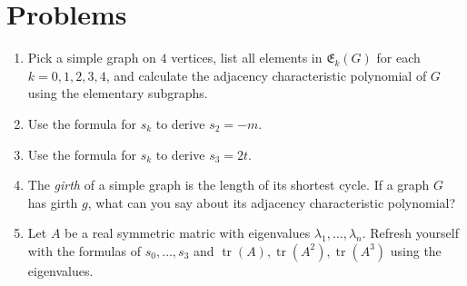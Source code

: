\documentclass{article}
\newcommand{\tr}{\operatorname{tr}}
\theoremstyle{definition}
\begin{document}
\section*{Problems}
\begin{enumerate}
\setlength\itemsep{2em}
\item Pick a simple graph on $4$ vertices, list all elements in $\mathfrak{E}_k(G)$ for each $k = 0,1,2,3,4$, and calculate the adjacency characteristic polynomial of $G$ using the elementary subgraphs.
\item Use the formula for $s_k$ to derive $s_2 = -m$.  
\item Use the formula for $s_k$ to derive $s_3 = 2t$.  
\item The \emph{girth} of a simple graph is the length of its shortest cycle.  If a graph $G$ has girth $g$, what can you say about its adjacency characteristic polynomial?
\item Let $A$ be a real symmetric matric with eigenvalues $\lambda_1,\ldots, \lambda_n$.  Refresh yourself with the formulas of $s_0,\ldots, s_3$ and $\tr(A),\tr(A^2),\tr(A^3)$ using the eigenvalues.
\end{enumerate}

\end{document}
